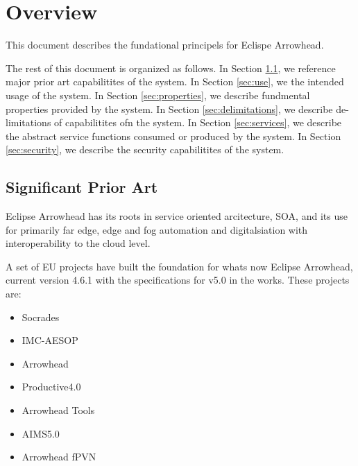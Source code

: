 \documentclass[a4paper]{arrowhead}
\begin{document}
\section{Overview}
\label{sec:overview}
This document describes the fundational principels for Eclispe
Arrowhead. 

The rest of this document is organized as follows.
In Section \ref{sec:prior_art}, we reference major prior art capabilitites
of the system.
In Section \ref{sec:use}, we the intended usage of the system.
In Section \ref{sec:properties}, we describe fundmental properties
provided by the system.
In Section \ref{sec:delimitations}, we describe de-limitations of capabilitites
ofn the system.
In Section \ref{sec:services}, we describe the abstract service
functions consumed or produced by the system.
In Section \ref{sec:security}, we describe the security capabilitites
of the system.

\newpage

\subsection{Significant Prior Art}
\label{sec:prior_art}

Eclipse Arrowhead has its roots in service oriented arcitecture, SOA,
and its use for primarily far edge, edge and fog automation and
digitalsiation with interoperability to the cloud level.

A set of EU projects have built the foundation for whats now Eclipse
Arrowhead, current version 4.6.1 with the specifications for v5.0 in
the works. These projects are:
\begin{itemize}
\item Socrades
\item IMC-AESOP
\item Arrowhead
\item Productive4.0
\item Arrowhead Tools
\item AIMS5.0
\item Arrowhead fPVN
\end{itemize}
\end{document}
